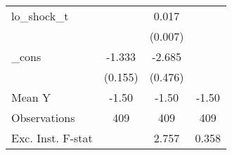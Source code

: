 {\begin{tabular}{l*{3}{c}}
\addlinespace
lo\_shock\_t  &                     &       0.017\sym{**} &                     \\
            &                     &     (0.007)         &                     \\
\addlinespace
\_cons      &      -1.333\sym{***}&      -2.685\sym{***}&                     \\
            &     (0.155)         &     (0.476)         &                     \\
\midrule
Mean Y      &       -1.50         &       -1.50         &       -1.50         \\
Observations&         409         &         409         &         409         \\
Exc. Inst. F-stat&                     &       2.757         &       0.358         \\
\bottomrule
\end{tabular}
}
